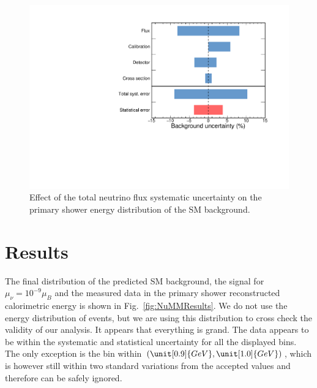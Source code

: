\begin{figure}[hbtp]
\centering
\includegraphics[width=.9\textwidth]{Plots/NuMM/RelativeErrorBarChart.pdf}
\caption[Summary of systematic uncertainties]{Effect of the total neutrino flux systematic uncertainty on the primary shower energy distribution of the \acrshort{SM} background.}
\label{fig:NuMMErrorBarChart}
\end{figure}


\section{Results}\label{sec:NuMMResults}

The final distribution of the predicted \gls{SM} background, the signal for $\mu_{\nu}=10^{-9}\mu_B$ and the measured data in the primary shower reconstructed calorimetric energy is shown in Fig.~\ref{fig:NuMMResults}. We do not use the energy distribution of events, but we are using this distribution to cross check the validity of our analysis. It appears that everything is grand. The data appears to be within the systematic and statistical uncertainty for all the displayed bins. The only exception is the bin within $\left(\unit[0.9]{GeV},\unit[1.0]{GeV}\right)$, which is however still within two standard variations from the accepted values and therefore can be safely ignored.

